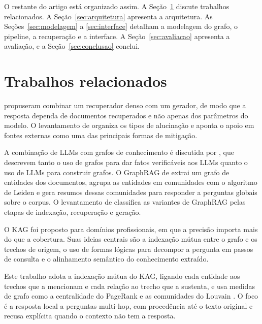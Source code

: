 \documentclass[12pt]{article}
\providecommand{\citeasnoun}[1]{\cite{#1}}
\begin{document}
O restante do artigo está organizado assim. A Seção~\ref{sec:relacionados} discute
trabalhos relacionados. A Seção~\ref{sec:arquitetura} apresenta a arquitetura. As
Seções~\ref{sec:modelagem} a \ref{sec:interface} detalham a modelagem do grafo, o
pipeline, a recuperação e a interface. A Seção~\ref{sec:avaliacao} apresenta a
avaliação, e a Seção~\ref{sec:conclusao} conclui.

\section{Trabalhos relacionados}
\label{sec:relacionados}

\citeasnoun{lewis2020rag} propuseram combinar um recuperador denso com um gerador, de
modo que a resposta dependa de documentos recuperados e não apenas dos parâmetros do
modelo. O levantamento de \citeasnoun{ji2023survey} organiza os tipos de alucinação e
aponta o apoio em fontes externas como uma das principais formas de mitigação.

A combinação de LLMs com grafos de conhecimento é discutida por \citeasnoun{pan2024unifying},
que descrevem tanto o uso de grafos para dar fatos verificáveis aos LLMs quanto o uso de
LLMs para construir grafos. O GraphRAG de \citeasnoun{edge2024graphrag} extrai um grafo de
entidades dos documentos, agrupa as entidades em comunidades com o algoritmo de Leiden e
gera resumos dessas comunidades para responder a perguntas globais sobre o corpus. O
levantamento de \citeasnoun{peng2024graphragsurvey} classifica as variantes de GraphRAG
pelas etapas de indexação, recuperação e geração.

O KAG \cite{liang2024kag} foi proposto para domínios profissionais, em que a precisão
importa mais do que a cobertura. Suas ideias centrais são a indexação mútua entre o grafo
e os trechos de origem, o uso de formas lógicas para decompor a pergunta em passos de
consulta e o alinhamento semântico do conhecimento extraído.

Este trabalho adota a indexação mútua do KAG, ligando cada entidade aos trechos que a
mencionam e cada relação ao trecho que a sustenta, e usa medidas de grafo como a
centralidade do PageRank \cite{page1999pagerank} e as comunidades do Louvain
\cite{blondel2008louvain}. O foco é a resposta local a perguntas multi-hop, com
procedência até o texto original e recusa explícita quando o contexto não tem a resposta.

\end{document}
